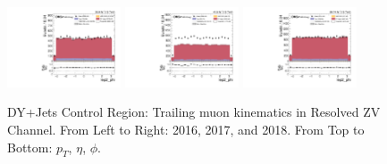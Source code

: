 \begin{figure}[!ht]
  \includegraphics[width=0.30\textwidth]{analysis_plots/2016_zjj/cr_vjets_m/lep2_phi.pdf}
  \includegraphics[width=0.30\textwidth]{analysis_plots/2017_zjj/cr_vjets_m/lep2_phi.pdf}
  \includegraphics[width=0.30\textwidth]{analysis_plots/2018_zjj/cr_vjets_m/lep2_phi.pdf} \\
  \caption[DY+Jets Control Region: Trailing muon kinematics in Resolved ZV Channel]%
  {DY+Jets Control Region: Trailing muon kinematics in Resolved ZV Channel. From Left to Right: 2016,
    2017, and 2018. From Top to Bottom: \( p_T \), \( \eta \), \( \phi \).}%
  \label{fig:zjj-cr-vjets-m-lep2-pt-eta-phi}
\end{figure}

